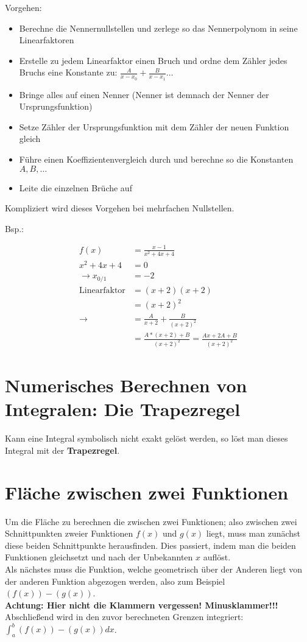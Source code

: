 \documentclass[12pt, a4paper]{scrreprt}
\begin{document}
Vorgehen:
\begin{itemize}
\item Berechne die Nennernullstellen und zerlege so das Nennerpolynom in seine Linearfaktoren
\item Erstelle zu jedem Linearfaktor einen Bruch und ordne dem Zähler jedes Bruchs eine Konstante zu: \(\frac{A}{x-x_0} + \frac{B}{x-x_1} \dots\)
\item Bringe alles auf einen Nenner (Nenner ist demnach der Nenner der Ursprungsfunktion)
\item Setze Zähler der Ursprungsfunktion mit dem Zähler der neuen Funktion gleich
\item Führe einen Koeffizientenvergleich durch und berechne so die Konstanten \(A, B, \dots\)
\item Leite die einzelnen Brüche auf
\end{itemize}

Kompliziert wird dieses Vorgehen bei mehrfachen Nullstellen.

Bsp.:

\begin{align*}
  f(x) &= \frac{x-1}{x^2+4x+4}\\[1em]
  x^2+4x+4 &= 0\\[1em]
  \rightarrow x_{0/1} &= -2\\[1em]
  \text{Linearfaktor} &= (x+2)(x+2)\\[1em]
       &= {(x+2)}^2\\[1em]
  \rightarrow &= \frac{A}{x+2} + \frac{B}{{(x+2)}^2}\\[1em]
  &= \frac{A * (x+2) + B}{{(x+2)}^2} = \frac{Ax + 2A + B}{{(x+2)}^2}
\end{align*}

\section{Numerisches Berechnen von Integralen: Die Trapezregel}

Kann eine Integral symbolisch nicht exakt gelöst werden, so löst man dieses Integral mit der \textbf{Trapezregel}.

\section{Fläche zwischen zwei Funktionen}

Um die Fläche zu berechnen die zwischen zwei Funktionen; also zwischen zwei Schnittpunkten zweier Funktionen \(f(x)\) und \(g(x)\) liegt, muss man zunächst diese beiden Schnittpunkte herausfinden. Dies passiert, indem man die beiden Funktionen gleichsetzt und nach der Unbekannten \(x\) auflöst.\\
Als nächstes muss die Funktion, welche geometrisch \glqq{} über \grqq{} der Anderen liegt von der anderen Funktion abgezogen werden, also zum Beispiel \((f(x)) - (g(x))\).\\
\myhspace{} \textbf{Achtung: Hier nicht die Klammern vergessen! Minusklammer!!!}\\
Abschließend wird in den zuvor berechneten Grenzen integriert: \(\int_a^b (f(x)) - (g(x)) dx\).
\end{document}
